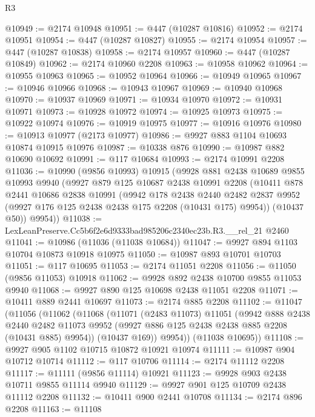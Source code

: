 \begin{lexlean}{R3}
\begin{coremodule}
@10949 := @2174 @10948
@10951 := @447 (@10287 @10816)
@10952 := @2174 @10951
@10954 := @447 (@10287 @10827)
@10955 := @2174 @10954
@10957 := @447 (@10287 @10838)
@10958 := @2174 @10957
@10960 := @447 (@10287 @10849)
@10962 := @2174 @10960 @2208
@10963 := @10958 @10962
@10964 := @10955 @10963
@10965 := @10952 @10964
@10966 := @10949 @10965
@10967 := @10946 @10966
@10968 := @10943 @10967
@10969 := @10940 @10968
@10970 := @10937 @10969
@10971 := @10934 @10970
@10972 := @10931 @10971
@10973 := @10928 @10972
@10974 := @10925 @10973
@10975 := @10922 @10974
@10976 := @10919 @10975
@10977 := @10916 @10976
@10980 := @10913 @10977 (@2173 @10977)
@10986 := @9927 @883 @1104 @10693 @10874 @10915 @10976
@10987 := @10338 @876
@10990 := @10987 @882 @10690 @10692
@10991 := @117 @10684
@10993 := @2174 @10991 @2208
@11036 := @10990
    (@9856 @10993)
    @10915
    (@9928
      @881
      @2438
      @10689
      @9855
      @10993
      @9940
      (@9927
        @879
        @125
        @10687
        @2438
        @10991
        @2208
        (@10411
          @878
          @2441
          @10686
          @2838
          @10991
          (@9942
            @178
            @2438
            @2440
            @2482
            @2837
            @9952
            (@9927 @176 @125 @2438 @2438 @175 @2208 (@10431 @175) @9954))
          (@10437 @50))
        @9954))
@11038 := LexLeanPreserve.Cc5b6f2e6d9333bad985206c2340ec23b.R3.__rel_21 @2460
@11041 := @10986 (@11036 (@11038 @10684))
@11047 := @9927 @894 @1103 @10704 @10873 @10918 @10975
@11050 := @10987 @893 @10701 @10703
@11051 := @117 @10695
@11053 := @2174 @11051 @2208
@11056 := @11050 (@9856 @11053) @10918
@11062 := @9928 @892 @2438 @10700 @9855 @11053 @9940
@11068 := @9927 @890 @125 @10698 @2438 @11051 @2208
@11071 := @10411 @889 @2441 @10697
@11073 := @2174 @885 @2208
@11102 := @11047
    (@11056
      (@11062
        (@11068
          (@11071
            (@2483 @11073)
            @11051
            (@9942
              @888
              @2438
              @2440
              @2482
              @11073
              @9952
              (@9927 @886 @125 @2438 @2438 @885 @2208 (@10431 @885) @9954))
            (@10437 @169))
          @9954))
      (@11038 @10695))
@11108 := @9927 @905 @1102 @10715 @10872 @10921 @10974
@11111 := @10987 @904 @10712 @10714
@11112 := @117 @10706
@11114 := @2174 @11112 @2208
@11117 := @11111 (@9856 @11114) @10921
@11123 := @9928 @903 @2438 @10711 @9855 @11114 @9940
@11129 := @9927 @901 @125 @10709 @2438 @11112 @2208
@11132 := @10411 @900 @2441 @10708
@11134 := @2174 @896 @2208
@11163 := @11108

\end{coremodule}
\end{lexlean}
